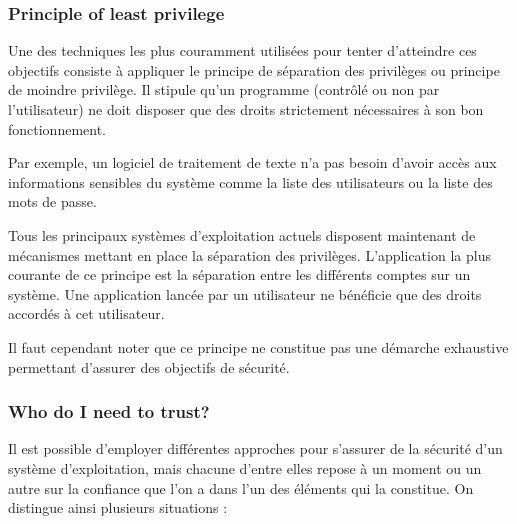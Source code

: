\documentclass[pdftex,a4paper,titlepage,11pt]{article}
\begin{document}
\subsubsection{Principle of least privilege}

Une des techniques les plus couramment utilisées pour tenter d'atteindre ces objectifs consiste à appliquer le principe de séparation des privilèges ou principe de moindre privilège. Il stipule qu'un programme (contrôlé ou non par l'utilisateur) ne doit disposer que des droits strictement nécessaires à son bon fonctionnement.

Par exemple, un logiciel de traitement de texte n'a pas besoin d'avoir accès aux informations sensibles du système comme la liste des utilisateurs ou la liste des mots de passe.

Tous les principaux systèmes d'exploitation actuels disposent maintenant de mécanismes mettant en place la séparation des privilèges. L'application la plus courante de ce principe est la séparation entre les différents comptes sur un système. Une application lancée par un utilisateur ne bénéficie que des droits accordés à cet utilisateur.

Il faut cependant noter que ce principe ne constitue pas une démarche exhaustive permettant d'assurer des objectifs de sécurité.

\subsubsection{Who do I need to trust?}

Il est possible d'employer différentes approches pour s'assurer de la sécurité d'un système d'exploitation, mais chacune d'entre elles repose à un moment ou un autre sur la confiance que l'on a dans l'un des éléments qui la constitue. On distingue ainsi plusieurs situations \cite{WCS}:
\end{document}
